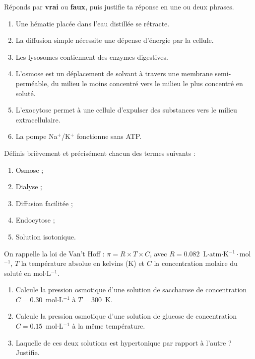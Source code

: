 \documentclass[11pt]{article}
\begin{document}
\begin{exercice}
Réponds par \textbf{vrai} ou \textbf{faux}, puis justifie ta réponse en une ou deux phrases.
\begin{enumerate}
\item Une hématie placée dans l'eau distillée se rétracte.
\item La diffusion simple nécessite une dépense d'énergie par la cellule.
\item Les lysosomes contiennent des enzymes digestives.
\item L'osmose est un déplacement de solvant à travers une membrane semi-perméable, du milieu le moins concentré vers le milieu le plus concentré en soluté.
\item L'exocytose permet à une cellule d'expulser des substances vers le milieu extracellulaire.
\item La pompe Na$^+$/K$^+$ fonctionne sans ATP.
\end{enumerate}
\end{exercice}

\begin{exercice}[Définitions]
Définis brièvement et précisément chacun des termes suivants :
\begin{enumerate}
\item Osmose ;
\item Dialyse ;
\item Diffusion facilitée ;
\item Endocytose ;
\item Solution isotonique.
\end{enumerate}
\end{exercice}

\begin{exercice}
On rappelle la loi de Van't Hoff : $\pi = R \times T \times C$, avec $R = \num{0,082}$~L$\cdot$atm$\cdot$K$^{-1}\cdot$mol$^{-1}$, $T$ la température absolue en kelvins (K) et $C$ la concentration molaire du soluté en mol$\cdot$L$^{-1}$.
\begin{enumerate}
\item Calcule la pression osmotique d'une solution de saccharose de concentration $C = \num{0,30}$~mol$\cdot$L$^{-1}$ à $T = 300$~K.
\item Calcule la pression osmotique d'une solution de glucose de concentration $C = \num{0,15}$~mol$\cdot$L$^{-1}$ à la même température.
\item Laquelle de ces deux solutions est hypertonique par rapport à l'autre ? Justifie.
\end{enumerate}
\end{exercice}
\end{document}
